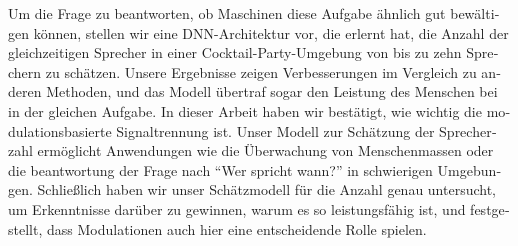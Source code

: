 \begin{otherlanguage}{ngerman}
Um die Frage zu beantworten, ob Maschinen diese Aufgabe ähnlich gut bewältigen können, stellen wir eine DNN-Architektur vor, die erlernt hat, die Anzahl der gleichzeitigen Sprecher in einer Cocktail-Party-Umgebung von bis zu zehn Sprechern zu schätzen.
Unsere Ergebnisse zeigen Verbesserungen im Vergleich zu anderen Methoden, und das Modell übertraf sogar den Leistung des Menschen bei in der gleichen Aufgabe.
In dieser Arbeit haben wir bestätigt, wie wichtig die modulationsbasierte Signaltrennung ist.
Unser Modell zur Schätzung der Sprecherzahl ermöglicht Anwendungen wie die Überwachung von Menschenmassen oder die beantwortung der Frage nach ``Wer spricht wann?'' in schwierigen Umgebungen.
Schließlich haben wir unser Schätzmodell für die Anzahl genau untersucht, um Erkenntnisse darüber zu gewinnen, warum es so leistungsfähig ist, und festgestellt, dass Modulationen auch hier eine entscheidende Rolle spielen.
\end{otherlanguage}

\endgroup

\vfill
